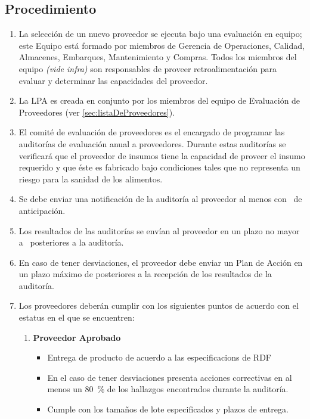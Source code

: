 \subsection{Procedimiento}
\begin{enumerate}
    \item La selección de un nuevo proveedor se ejecuta bajo una evaluación en equipo; este Equipo está formado por miembros de Gerencia de Operaciones, Calidad, Almacenes, Embarques, Mantenimiento y Compras. Todos los miembros del equipo \textit{(vide infra)} son responsables de proveer retroalimentación para evaluar y determinar las capacidades del proveedor.
    \item La \Gls{LPA} es creada en conjunto por los miembros del equipo de Evaluación de Proveedores (ver \cref{sec:listaDeProveedores}).
    \item El comité de evaluación de proveedores es el encargado de programar las auditorías de evaluación anual a proveedores. Durante estas auditorías se verificará que el proveedor de insumos tiene la capacidad de proveer el insumo requerido y que éste es fabricado bajo condiciones tales que no representa un riesgo para la sanidad de los alimentos.
    \item Se debe enviar una notificación de la auditoría al proveedor al menos con \NotifAuditoriaAProveedor~de anticipación.
    \item Los resultados de las auditorías se envían al proveedor en un plazo no mayor a \PlazoResultadoAProveedor~posteriores a la auditoría.
    \item En caso de tener desviaciones, el proveedor debe enviar un Plan de Acción en un plazo máximo de \PlazoPlanDeAccionAuditProveedor posteriores a la recepción de los resultados de la auditoría.
    \item Los proveedores deberán cumplir con los siguientes puntos de acuerdo con el estatus en el que se encuentren:
          \begin{enumerate}
              \item \textbf{Proveedor Aprobado}
                    \begin{itemize}
                        \item Entrega de producto de acuerdo a las \glspl{especificacion} de \Gls{RDF}
                        \item En el caso de tener desviaciones presenta acciones correctivas en al menos un \qty{80}{\percent} de los hallazgos encontrados durante la auditoría.
                        \item Cumple con los tamaños de lote especificados y plazos de entrega.

\end{itemize}
\end{enumerate}
\end{enumerate}
